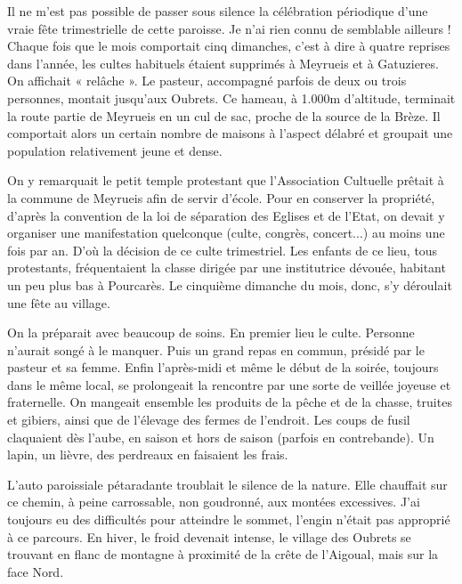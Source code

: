 

Il ne m’est pas possible de passer sous silence la célébration périodique d’une vraie
fête trimestrielle de cette paroisse. Je n’ai rien connu de semblable ailleurs ! Chaque
fois que le mois comportait cinq dimanches, c’est à dire à quatre reprises dans
l’année, les cultes habituels étaient supprimés à Meyrueis et à Gatuzieres. On affichait
« relâche ». Le pasteur, accompagné parfois de deux ou trois personnes, montait
jusqu’aux Oubrets. Ce hameau, à 1.000m d’altitude, terminait la route partie de
Meyrueis en un cul de sac, proche de la source de la Brèze. Il comportait alors un
certain nombre de maisons à l’aspect délabré et groupait une population relativement
jeune et dense.

On y remarquait le petit temple protestant que l’Association Cultuelle prêtait à la
commune de Meyrueis afin de servir d’école. Pour en conserver la propriété, d’après
la convention de la loi de séparation des Eglises et de l’Etat, on devait y organiser une
manifestation quelconque (culte, congrès, concert...) au moins une fois par an. D’où
la décision de ce culte trimestriel. Les enfants de ce lieu, tous protestants,
fréquentaient la classe dirigée par une institutrice dévouée, habitant un peu plus bas à
Pourcarès. Le cinquième dimanche du mois, donc, s’y déroulait une fête au village.

On la préparait avec beaucoup de soins. En premier lieu le culte. Personne n’aurait
songé à le manquer. Puis un grand repas en commun, présidé par le pasteur et sa
femme. Enfin l’après-midi et même le début de la soirée, toujours dans le même
local, se prolongeait la rencontre par une sorte de veillée joyeuse et fraternelle. On
mangeait ensemble les produits de la pêche et de la chasse, truites et gibiers, ainsi que
de l’élevage des fermes de l’endroit. Les coups de fusil claquaient dès l’aube, en
saison et hors de saison (parfois en contrebande). Un lapin, un lièvre, des perdreaux
en faisaient les frais.

L’auto paroissiale pétaradante troublait le silence de la nature. Elle chauffait sur ce
chemin, à peine carrossable, non goudronné, aux montées excessives. J’ai toujours eu
des difficultés pour atteindre le sommet, l’engin n’était pas approprié à ce parcours.
En hiver, le froid devenait intense, le village des Oubrets se trouvant en flanc de
montagne à proximité de la crête de l’Aigoual, mais sur la face Nord.

